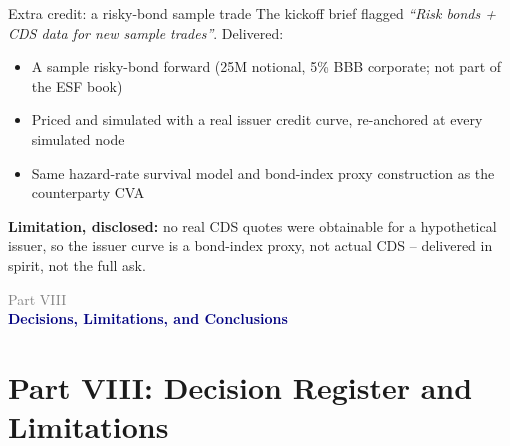 \documentclass[8pt,aspectratio=169]{beamer}
\newcommand{\partframe}[2]{%
\begin{frame}
  \vspace{1.2cm}
  {\large\textcolor{grey}{Part #1}}\\[4pt]
  {\Large\textcolor{navy}{\textbf{#2}}}
\end{frame}}
\begin{document}
\begin{frame}{Extra credit: a risky-bond sample trade}
  \small
  The kickoff brief flagged \emph{``Risk bonds + CDS data for new sample trades''}. Delivered:
  \begin{itemize}
    \item A sample risky-bond forward (25M notional, 5\% BBB corporate; not part of the ESF book)
    \item Priced and simulated with a real issuer credit curve, re-anchored at every simulated node
    \item Same hazard-rate survival model and bond-index proxy construction as the counterparty CVA
  \end{itemize}
  \vspace{6pt}
  \textbf{Limitation, disclosed:} no real CDS quotes were obtainable for a hypothetical issuer, so the issuer curve is a bond-index proxy, not actual CDS -- delivered in spirit, not the full ask.
\end{frame}

\partframe{VIII}{Decisions, Limitations, and Conclusions}
\section{Part VIII: Decision Register and Limitations}
\end{document}
